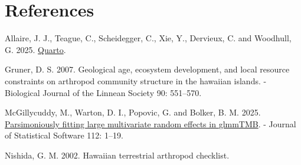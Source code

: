 \documentclass[
  letterpaper,
  DIV=11,
  numbers=noendperiod]{scrartcl}
\newlength{\cslhangindent}
\newenvironment{CSLReferences}[2] %
 {\begin{list}{}{%
  \setlength{\itemindent}{0pt}
  \setlength{\leftmargin}{0pt}
  \setlength{\parsep}{0pt}
  \ifodd #1
   \setlength{\leftmargin}{\cslhangindent}
   \setlength{\itemindent}{-1\cslhangindent}
  \fi
  \setlength{\itemsep}{#2\baselineskip}}}
 {\end{list}}
\begin{document}
\section*{References}\label{references}

\label{refs}
\begin{CSLReferences}{1}{1}
Allaire, J. J., Teague, C., Scheidegger, C., Xie, Y., Dervieux, C. and
Woodhull, G. 2025.
\href{https://doi.org/10.5281/zenodo.5960048}{{Quarto}}.

Gruner, D. S. 2007. Geological age, ecosystem development, and local
resource constraints on arthropod community structure in the hawaiian
islands. - Biological Journal of the Linnean Society 90: 551--570.

McGillycuddy, M., Warton, D. I., Popovic, G. and Bolker, B. M. 2025.
\href{https://doi.org/10.18637/jss.v112.i01}{Parsimoniously fitting
large multivariate random effects in {glmmTMB}}. - Journal of
Statistical Software 112: 1--19.

Nishida, G. M. 2002. Hawaiian terrestrial arthropod checklist.

\end{CSLReferences}
\end{document}
